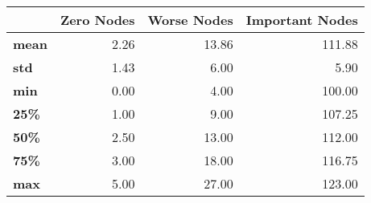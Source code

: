 \begin{tabular}{lrrr}
\toprule
{} &  Zero Nodes &  Worse Nodes &  Important Nodes \\
\midrule
\textbf{mean} &        2.26 &        13.86 &           111.88 \\
\textbf{std } &        1.43 &         6.00 &             5.90 \\
\textbf{min } &        0.00 &         4.00 &           100.00 \\
\textbf{25\% } &        1.00 &         9.00 &           107.25 \\
\textbf{50\% } &        2.50 &        13.00 &           112.00 \\
\textbf{75\% } &        3.00 &        18.00 &           116.75 \\
\textbf{max } &        5.00 &        27.00 &           123.00 \\
\bottomrule
\end{tabular}
